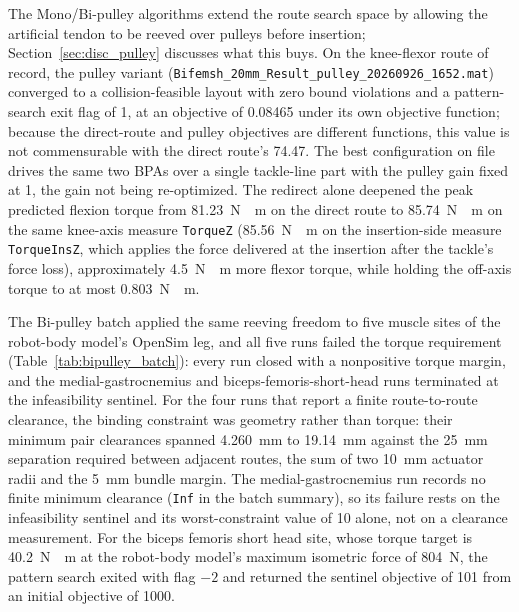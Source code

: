 The Mono/Bi-pulley algorithms extend the route search space by allowing the artificial tendon to be reeved over pulleys before insertion; Section~\ref{sec:disc_pulley} discusses what this buys. On the knee-flexor route of record, the pulley variant (\texttt{Bifemsh\_20mm\_Result\_pulley\_20260926\_1652.mat}) converged to a collision-feasible layout with zero bound violations and a pattern-search exit flag of 1, at an objective of 0.08465 under its own objective function; because the direct-route and pulley objectives are different functions, this value is not commensurable with the direct route's 74.47. The best configuration on file drives the same two BPAs over a single tackle-line part with the pulley gain fixed at 1, the gain not being re-optimized. The redirect alone deepened the peak predicted flexion torque from \qty{81.23}{\newton\cdot\meter} on the direct route to \qty{85.74}{\newton\cdot\meter} on the same knee-axis measure \texttt{TorqueZ} (\qty{85.56}{\newton\cdot\meter} on the insertion-side measure \texttt{TorqueInsZ}, which applies the force delivered at the insertion after the tackle's force loss), approximately \qty{4.5}{\newton\cdot\meter} more flexor torque, while holding the off-axis torque to at most \qty{0.803}{\newton\cdot\meter}.

The Bi-pulley batch applied the same reeving freedom to five muscle sites of the robot-body model's OpenSim leg, and all five runs failed the torque requirement (Table~\ref{tab:bipulley_batch}): every run closed with a nonpositive torque margin, and the medial-gastrocnemius and biceps-femoris-short-head runs terminated at the infeasibility sentinel. For the four runs that report a finite route-to-route clearance, the binding constraint was geometry rather than torque: their minimum pair clearances spanned \qty{4.260}{\mm} to \qty{19.14}{\mm} against the \qty{25}{\mm} separation required between adjacent routes, the sum of two \qty{10}{\mm} actuator radii and the \qty{5}{\mm} bundle margin. The medial-gastrocnemius run records no finite minimum clearance (\texttt{Inf} in the batch summary), so its failure rests on the infeasibility sentinel and its worst-constraint value of 10 alone, not on a clearance measurement. For the biceps femoris short head site, whose torque target is \qty{40.2}{\newton\cdot\meter} at the robot-body model's maximum isometric force of \qty{804}{\N}, the pattern search exited with flag $-2$ and returned the sentinel objective of 101 from an initial objective of 1000.

